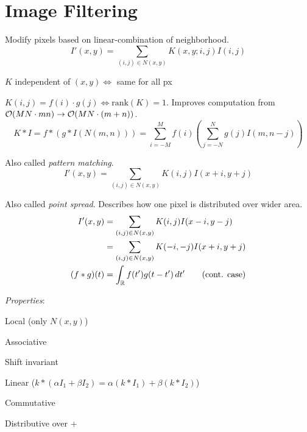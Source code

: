 \section{Image Filtering}
Modify pixels based on linear-combination of neighborhood.
\[I'(x, y) = \sum_{(i, j) \in N(x, y)} K(x, y; i, j)I(i, j)\]

\begin{definition}
  \(K\) independent of \((x, y) \iff\) same for all px
\end{definition}

\begin{definition}[Separable \(K\)]
  \(K(i, j) = f(i) \cdot g(j) \iff \text{rank}(K) = 1\).
  Improves computation from \(\mathcal{O}(MN \cdot mn) \to \mathcal{O}(MN \cdot (m + n))\).
\[
K * I = f * (g * I(N(m,n)))=\sum_{i=-M}^M f(i) \left(\sum_{j=-N}^N g(j) I(m,n-j) \right)
\]
\end{definition}

\begin{definition}
  Also called \textit{pattern matching}.
  \[I'(x, y) = \sum_{(i, j) \in N(x, y)} K(i, j) I(x + i, y + j)\]
\end{definition}

\begin{definition}
  Also called \textit{point spread}. Describes how one pixel is distributed over wider area.
  \begin{align*}
    I'(x, y) &= \sum_{(i, j) \in N(x, y)} K(i, j) I(x - i, y - j) \\
    &= \sum_{(i, j) \in N(x, y)} K(-i, -j) I(x + i, y + j) \\
  (f \ast g)(t) &= \int_{\operatorname{\mathbb{R}}} f(t')g(t - t') \, dt' \qquad (\text{cont. case})
  \end{align*}

  \textit{Properties}:
  \begin{itemize*}
    \item Local (only \(N(x, y)\))
    \item Associative
    \item Shift invariant
    \item Linear (\(k \ast (\alpha I_1 + \beta I_2) = \alpha(k \ast I_1) + \beta(k \ast I_2)\))
    \item Commutative
    \item Distributive over +
  \end{itemize*}
\end{definition}

